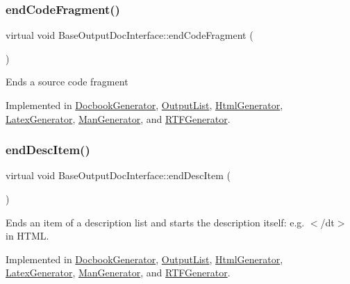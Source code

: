 \subsubsection{\texorpdfstring{endCodeFragment()}{endCodeFragment()}}
{\footnotesize\ttfamily virtual void Base\+Output\+Doc\+Interface\+::end\+Code\+Fragment (\begin{DoxyParamCaption}{ }\end{DoxyParamCaption})\hspace{0.3cm}{\ttfamily [pure virtual]}}

Ends a source code fragment 

Implemented in \mbox{\hyperlink{class_docbook_generator_a5f6585ebe5d203c47bb25cefdd30d8fd}{Docbook\+Generator}}, \mbox{\hyperlink{class_output_list_a9fccddf083f487654f6e6ce261fafff8}{Output\+List}}, \mbox{\hyperlink{class_html_generator_a6df6ede2137490c79228b9825df3b263}{Html\+Generator}}, \mbox{\hyperlink{class_latex_generator_a761292f353178bad45e21ca40cbe6115}{Latex\+Generator}}, \mbox{\hyperlink{class_man_generator_a4e825c27561ebb51c155840d9101725a}{Man\+Generator}}, and \mbox{\hyperlink{class_r_t_f_generator_ae75111adf81a1179b924ab7656d8c74c}{R\+T\+F\+Generator}}.

\mbox{\label{class_base_output_doc_interface_a09e3aa9d3faac55b2cc9290eaa69f55b}} 
\subsubsection{\texorpdfstring{endDescItem()}{endDescItem()}}
{\footnotesize\ttfamily virtual void Base\+Output\+Doc\+Interface\+::end\+Desc\+Item (\begin{DoxyParamCaption}{ }\end{DoxyParamCaption})\hspace{0.3cm}{\ttfamily [pure virtual]}}

Ends an item of a description list and starts the description itself\+: e.\+g. {\ttfamily $<$/dt$>$} in H\+T\+ML. 

Implemented in \mbox{\hyperlink{class_docbook_generator_ae46437543719a73a35d0202749633c15}{Docbook\+Generator}}, \mbox{\hyperlink{class_output_list_aca7c1dd564ed727ce77f9f2bc43a74ea}{Output\+List}}, \mbox{\hyperlink{class_html_generator_a0354681e6d39ae7da41d33f88656e335}{Html\+Generator}}, \mbox{\hyperlink{class_latex_generator_aa675b530ccd61f9c4784efc2abcedbaa}{Latex\+Generator}}, \mbox{\hyperlink{class_man_generator_ab86f06d399e075e2b6855319bf26e1ec}{Man\+Generator}}, and \mbox{\hyperlink{class_r_t_f_generator_aaeb8cbfab437b4198548c4f06dc12847}{R\+T\+F\+Generator}}.

